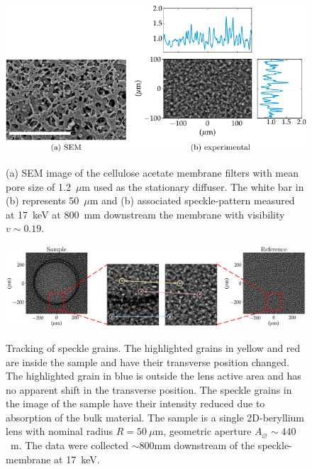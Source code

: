 \begin{refsection}
\begin{figure}[t]
        \centering
        {\includegraphics[width=0.7\linewidth]{figures/ch04/SpecklePattern.pdf}}
        \caption[Stationary diffuser and associated speckle-pattern]{(a) SEM image of the cellulose acetate membrane filters with mean pore size of 1.2~$\mu$m used as the stationary diffuser. The white bar in (b) represents 50~$\mu$m and (b) associated speckle-pattern measured at 17~keV at 800~mm downstream the membrane with visibility $v\sim0.19$.} \label{fig:SpecklePattern}
\end{figure}

\begin{figure}[t]
        \centering
        {\includegraphics[width=1\linewidth]{figures/ch04/speckle_tracking.pdf}}
        \caption[Tracking of speckle grain]{Tracking of speckle grains. The highlighted grains in yellow and red are inside the sample and have their transverse position changed. The highlighted grain in blue is outside the lens active area and has no apparent shift in the transverse position. The speckle grains in the image of the sample have their intensity reduced due to absorption of the bulk material. The sample is a single 2D-beryllium lens with nominal radius $R=50~\mu\text{m}$, geometric aperture $A_{\diameter}\sim440$~\textmu m. The data were collected $\sim$800mm downstream of the speckle-membrane at 17~keV.} \label{fig:speckle_tracking}
\end{figure}


\end{refsection}
